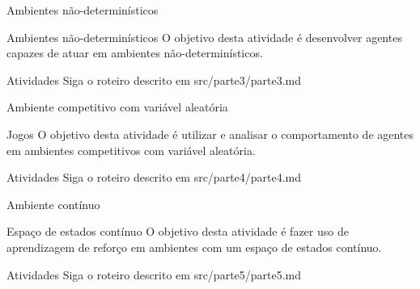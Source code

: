 \documentclass{beamer}
\begin{document}
\begin{frame}{Ambientes não-determinísticos}
	
	\begin{alertblock}{Ambientes não-determinísticos}
		O objetivo desta atividade é desenvolver agentes capazes de atuar em ambientes não-determinísticos.
	\end{alertblock}
	
	\begin{block}{Atividades}
		Siga o roteiro descrito em src/parte3/parte3.md \href{https://github.com/fbarth/reinLearn/blob/main/src/parte3/parte3.md}
		{}
	\end{block}
\end{frame}


\begin{frame}{Ambiente competitivo com variável aleatória}
	\begin{alertblock}{Jogos}
		O objetivo desta atividade é utilizar e analisar o comportamento de agentes em ambientes competitivos com variável aleatória.
	\end{alertblock}
	
	\begin{block}{Atividades}
		Siga o roteiro descrito em src/parte4/parte4.md \href{https://github.com/fbarth/reinLearn/blob/main/src/parte4/parte4.md}
		{}
	\end{block}
\end{frame}

\begin{frame}{Ambiente contínuo}
	
	\begin{alertblock}{Espaço de estados contínuo}
		O objetivo desta atividade é fazer uso de aprendizagem de reforço em ambientes com um espaço de estados contínuo.
	\end{alertblock}
	
	\begin{block}{Atividades}
		Siga o roteiro descrito em src/parte5/parte5.md \href{https://github.com/fbarth/reinLearn/blob/main/src/parte5/parte5.md}
		{}
	\end{block}
\end{frame}


\end{document}
